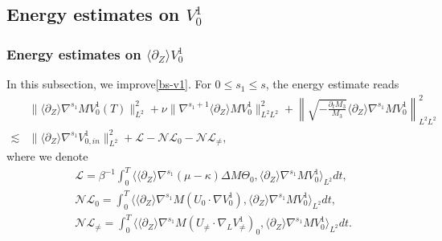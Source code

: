\documentclass[12pt]{article}
\newcommand{\wtb}{\langle\partial_Z\rangle }
\newcommand{\wtc}{(1,\partial_Z)}
\numberwithin{equation}{section}
\begin{document}
	\subsection{Energy estimates on $V^1_0$}
	\subsubsection{Energy estimates on $\wtb V^1_0$}
	In this subsection, we improve\eqref{bs-v1}. For $0\leq s_1\leq s$, the energy estimate reads
	\begin{align*}
		&\|\wtb \nabla^{s_1} M V^1_0(T)\|^2_{ L^2}+\nu\| \nabla^{s_1+1} \wtb M V^1_0\|^2_{L^2L^2}+\left\|\sqrt{-\frac{\partial_tM_3}{M_3}}\wtb \nabla^{s_1}M V^1_0\right\|^2_{L^2L^2}\\
		\lesssim&\|\wtb \nabla^{s_1} V^1_{0,in}\|^2_{ L^2 } +\mathcal{L} -\mathcal{NL}_0-\mathcal{NL}_{\neq},
	\end{align*}
    where we denote
    \begin{align*}
        &\mathcal{L}=\beta^{-1}\int_{0}^{T}\langle \wtb \nabla^{s_1}(\mu-\kappa)\Delta M\Theta_0, \wtb \nabla^{s_1} M V^1_0\rangle_{L^2} dt,\\
        &\mathcal{NL}_{0}=\int_{0}^{T}\langle \wtb \nabla^{s_1} M(U_{0}\cdot\nabla V^1_{0}), \wtb \nabla^{s_1} M V^1_0\rangle_{L^2} dt,\\
        &\mathcal{NL}_{\neq}=\int_{0}^{T}\langle \wtb \nabla^{s_1} M (U_{\neq}\cdot\nabla_L V^1_{\neq})_0, \wtb \nabla^{s_1} M V^1_0\rangle_{L^2} dt.
    \end{align*}
\end{document}
